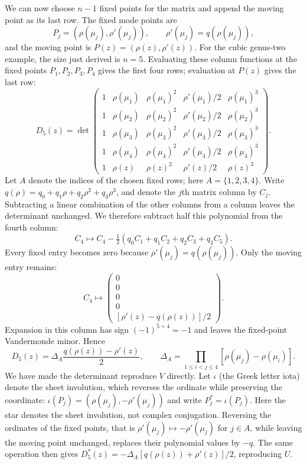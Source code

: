 \documentclass[11pt]{article}
\begin{document}
We can now choose $n-1$ fixed points for the matrix and append the moving point as its last row. The fixed mode points are
\[
P_j=(\rho(\mu_j),\rho'(\mu_j)),\qquad
\rho'(\mu_j)=q(\rho(\mu_j)),
\]
and the moving point is $P(z)=(\rho(z),\rho'(z))$. For the cubic genus-two example, the size just derived is $n=5$. Evaluating these column functions at the fixed points $P_1,P_2,P_3,P_4$ gives the first four rows; evaluation at $P(z)$ gives the last row:
\begin{equation}\label{eq:onishi-g2-matrix}
D_5(z)=\det\begin{pmatrix}
1&\rho(\mu_1)&\rho(\mu_1)^2&\rho'(\mu_1)/2&\rho(\mu_1)^3\\
1&\rho(\mu_2)&\rho(\mu_2)^2&\rho'(\mu_2)/2&\rho(\mu_2)^3\\
1&\rho(\mu_3)&\rho(\mu_3)^2&\rho'(\mu_3)/2&\rho(\mu_3)^3\\
1&\rho(\mu_4)&\rho(\mu_4)^2&\rho'(\mu_4)/2&\rho(\mu_4)^3\\
1&\rho(z)&\rho(z)^2&\rho'(z)/2&\rho(z)^3
\end{pmatrix}.
\end{equation}
Let $A$ denote the indices of the chosen fixed rows; here $A=\{1,2,3,4\}$. Write $q(\rho)=q_0+q_1\rho+q_2\rho^2+q_3\rho^3$, and denote the $j$th matrix column by $C_j$. Subtracting a linear combination of the other columns from a column leaves the determinant unchanged. We therefore subtract half this polynomial from the fourth column:
\[
C_4\longmapsto C_4-\tfrac12(q_0C_1+q_1C_2+q_2C_3+q_3C_5).
\]
Every fixed entry becomes zero because $\rho'(\mu_j)=q(\rho(\mu_j))$. Only the moving entry remains:
\[
C_4\longmapsto
\begin{pmatrix}0\\0\\0\\0\\{}[\rho'(z)-q(\rho(z))]/2\end{pmatrix}.
\]
Expansion in this column has sign $(-1)^{5+4}=-1$ and leaves the fixed-point Vandermonde minor. Hence
\[
D_5(z)=\Delta_A\frac{q(\rho(z))-\rho'(z)}2,\qquad
\Delta_A=\prod_{1\le i<j\le4}[\rho(\mu_j)-\rho(\mu_i)].
\]
We have made the determinant reproduce $V$ directly. Let $\iota$ (the Greek letter iota) denote the sheet involution, which reverses the ordinate while preserving the coordinate: $\iota(P_j)=(\rho(\mu_j),-\rho'(\mu_j))$ and write $P_j^*=\iota(P_j)$. Here the star denotes the sheet involution, not complex conjugation. Reversing the ordinates of the fixed points, that is $\rho'(\mu_j)\mapsto-\rho'(\mu_j)$ for $j\in A$, while leaving the moving point unchanged, replaces their polynomial values by $-q$. The same operation then gives $D_5^*(z)=-\Delta_A[q(\rho(z))+\rho'(z)]/2$, reproducing $U$.
\end{document}
